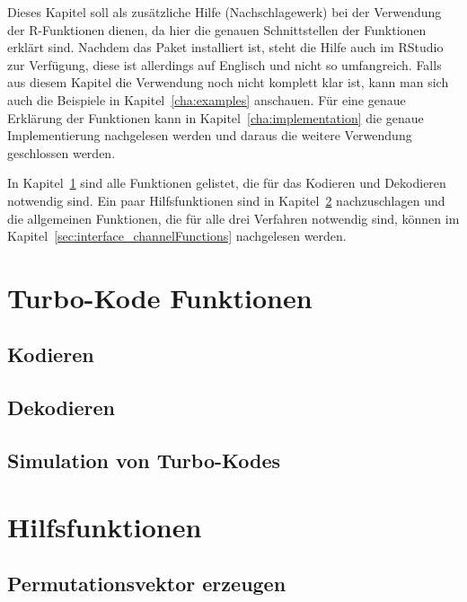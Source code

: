 Dieses Kapitel soll als zusätzliche Hilfe (Nachschlagewerk) bei der Verwendung der R-Funktionen dienen, da hier die genauen Schnittstellen der Funktionen erklärt sind. Nachdem das Paket installiert ist, steht die Hilfe auch im RStudio zur Verfügung, diese ist allerdings auf Englisch und nicht so umfangreich. Falls aus diesem Kapitel die Verwendung noch nicht komplett klar ist, kann man sich auch die Beispiele in Kapitel~\ref{cha:examples} anschauen. Für eine genaue Erklärung der Funktionen kann in Kapitel~\ref{cha:implementation} die genaue Implementierung nachgelesen werden und daraus die weitere Verwendung geschlossen werden.

In Kapitel~\ref{sec:interface_turboFunctions} sind alle Funktionen gelistet, die für das Kodieren und Dekodieren notwendig sind. Ein paar Hilfsfunktionen sind in Kapitel~\ref{sec:interface_helperFunctions} nachzuschlagen und die allgemeinen Funktionen, die für alle drei Verfahren notwendig sind, können im Kapitel~\ref{sec:interface_channelFunctions} nachgelesen werden. 
\newpage

\section{Turbo-Kode Funktionen}
\label{sec:interface_turboFunctions}

\subsection{Kodieren}
\label{sec:interface_encode}


\subsection{Dekodieren}
\label{sec:interface_decode}

\newpage

\subsection{Simulation von Turbo-Kodes}
\label{sec:interface_simulation}


\section{Hilfsfunktionen}
\label{sec:interface_helperFunctions}

\subsection{Permutationsvektor erzeugen}
\label{sec:interface_permutation}


